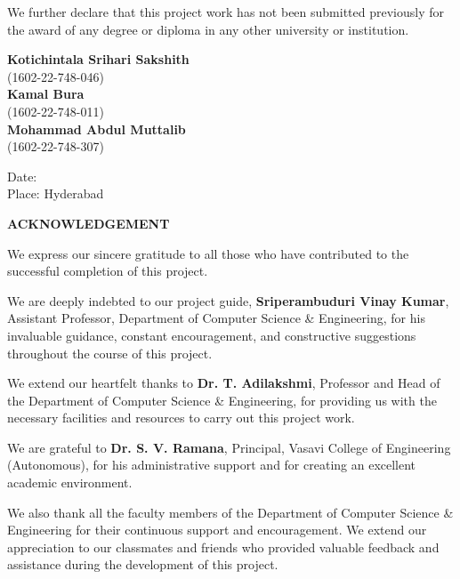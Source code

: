 \documentclass[12pt,a4paper]{report}
\newcommand{\studentA}{Kotichintala Srihari Sakshith}
\newcommand{\htnoA}{1602-22-748-046}
\newcommand{\studentB}{Kamal Bura}
\newcommand{\htnoB}{1602-22-748-011}
\newcommand{\studentC}{Mohammad Abdul Muttalib}
\newcommand{\htnoC}{1602-22-748-307}
\newcommand{\guide}{Sriperambuduri Vinay Kumar}
\newcommand{\designation}{Assistant Professor}
\newcommand{\hod}{Dr. T. Adilakshmi}
\newcommand{\college}{Vasavi College of Engineering (Autonomous)}
\begin{document}
\vspace{0.3in}
We further declare that this project work has not been submitted previously for the award of any degree or diploma in any other university or institution.

\vspace{0.8in}
\begin{flushright}
    \textbf{\studentA} \\
    (\htnoA) \\
    \vspace{0.3in}
    \textbf{\studentB} \\
    (\htnoB) \\
    \vspace{0.3in}
    \textbf{\studentC} \\
    (\htnoC)
\end{flushright}
\vspace{0.4in}
\begin{flushleft}
    Date: \underline{\hspace{1in}} \\
    Place: Hyderabad
\end{flushleft}

\newpage\thispagestyle{empty}\singlespacing
\begin{center}{\Large \textbf{ACKNOWLEDGEMENT}\par}\end{center}
\vspace{0.3in}
We express our sincere gratitude to all those who have contributed to the successful completion of this project.

\vspace{0.2in}
We are deeply indebted to our project guide, \textbf{\guide}, \designation, Department of Computer Science \& Engineering, for his invaluable guidance, constant encouragement, and constructive suggestions throughout the course of this project.

\vspace{0.2in}
We extend our heartfelt thanks to \textbf{\hod}, Professor and Head of the Department of Computer Science \& Engineering, for providing us with the necessary facilities and resources to carry out this project work.

\vspace{0.2in}
We are grateful to \textbf{Dr. S. V. Ramana}, Principal, \college, for his administrative support and for creating an excellent academic environment.

\vspace{0.2in}
We also thank all the faculty members of the Department of Computer Science \& Engineering for their continuous support and encouragement. We extend our appreciation to our classmates and friends who provided valuable feedback and assistance during the development of this project.
\end{document}
